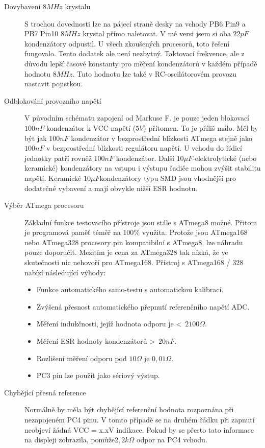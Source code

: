 \begin{description}
\item[Dovybavení \(8MHz\) krystalu] S trochou dovednosti lze na pájecí straně desky na vchody PB6 Pin9 a PB7 Pin10  \(8MHz\) krystal přímo naletovat. V mé versi jsem si oba \(22pF\) kondenzátory odpustil. U všech zkoušených procesorů, toto řešení fungovalo. Tento dodatek ale není nezbytný.
Taktovací frekvence, ale z důvodu lepší časové konstanty pro měření kondenzátorů v každém případě
hodnotu \(8MHz\). Tuto hodnotu lze také v RC-oscilátorovém provozu nastavit pojistkou.

\item[Odblokování provozního napětí]
V původním schématu zapojení od Markuse F. je pouze jeden blokovací \(100nF\)-kondenzátor
k VCC-napětí (\(5V\)) přítomen. To je příliš málo. Měl by být jak \(100nF\) kondenzátor v bezprostřední
blízkosti ATmega stejně jako \(100nF\) v bezprostřední blízkosti regulátoru napětí. U vchodu do 
řídicí jednotky patří rovněž  \(100nF\) kondenzátor. Další  \(10\mu F\)-elektrolytické (nebo keramické)
kondenzátory na vstupu i výstupu řadiče mohou zvýšit stabilitu napětí.
Keramické \(10\mu F\)kondenzátory typu SMD jsou vhodnější pro dodatečné vybavení a mají
obvykle nižší ESR hodnotu.

\item[Výběr ATmega procesoru]
Základní funkce testovacího přístroje jsou stále s ATmega8 možné.
Přitom je programová paměť téměř na  \(100\%\) využita.
Protože jsou ATmega168 nebo ATmega328 procesory pin kompatibilní s ATmega8,
lze náhradu pouze doporučit. Mezitím  je cena za ATmega328 tak nízká, že ve skutečnosti nic
nehovoří pro ATmega168.
Přístroj s ATmega168 / 328 nabízí následující výhody:
\begin{itemize} \setlength{\itemsep}{-0.4em}
\item Funkce automatického samo-testu s automatickou kalibrací.
\item Zvýšená přesnost automatického přepnutí referenčního napětí ADC.
\item Měření indukčnosti, jejíž hodnota odporu je  \textless~\(2100\Omega\).
\item Měření ESR hodnoty kondenzátorů \textgreater~\(20nF\).
\item Rozlišení měření odporu pod \(10\Omega\) je \(0,01\Omega\).
\item PC3 pin lze použít jako sériový výstup.
\end{itemize}

\item[Chybějící přesná reference]
Normálně by měla být chybějící referenční hodnota rozpoznána při nezapojeném PC4 pinu.
V tomto případě se na druhém řádku při zapnutí neobjeví žádná VCC = x.xV indikace.
Pokud by se přesto tato informace na displeji zobrazila, pomůže\(2,2k\Omega\) odpor na PC4 vchodu.
\end{description}

